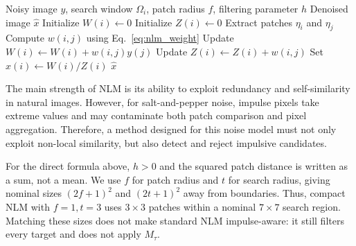 \documentclass[pdflatex,iicol,sn-mathphys-num]{sn-jnl}
\newcommand{\nlm}{NLM\xspace}
\newif\ifshowportuguese
\newcommand{\pt}[1]{\ifshowportuguese\par\begingroup\small\color{blue!55!black}\noindent\textbf{PT: }#1\par\endgroup\fi}
\begin{document}
\begin{algorithm}[!t]
    \caption{Classical Non-Local Means filter}
    \label{alg:nlm}
    \begin{algorithmic}[1]
        \Require Noisy image \(y\), search window \(\Omega_i\), patch radius \(f\), filtering parameter \(h\)
        \Ensure Denoised image \(\hat{x}\)
            \State Initialize \(W(i) \gets 0\)
            \State Initialize \(Z(i) \gets 0\)
                \State Extract patches \(\eta_i\) and \(\eta_j\)
                \State Compute \(w(i,j)\) using Eq.~\eqref{eq:nlm_weight}
                \State Update \(W(i) \gets W(i)+w(i,j)y(j)\)
                \State Update \(Z(i) \gets Z(i)+w(i,j)\)
            \EndFor
            \State Set \(\hat{x}(i) \gets W(i)/Z(i)\)
        \EndFor
        \State \Return \(\hat{x}\)
    \end{algorithmic}
\end{algorithm}

The main strength of \nlm is its ability to exploit redundancy and self-similarity in natural images. However, for salt-and-pepper noise, impulse pixels take extreme values and may contaminate both patch comparison and pixel aggregation. Therefore, a method designed for this noise model must not only exploit non-local similarity, but also detect and reject impulsive candidates.
\pt{A principal força do \nlm é sua capacidade de explorar redundância e auto-similaridade em imagens naturais. Entretanto, para ruído sal-e-pimenta, pixels impulsivos assumem valores extremos e podem contaminar tanto a comparação entre patches quanto a agregação de pixels. Portanto, um método projetado para esse modelo de ruído deve não apenas explorar similaridade não local, mas também detectar e rejeitar candidatos impulsivos.}


For the direct formula above, $h>0$ and the squared patch distance is written as a sum, not a mean. We use $f$ for patch radius and $t$ for search radius, giving nominal sizes $(2f+1)^2$ and $(2t+1)^2$ away from boundaries. Thus, compact NLM with $f=1,t=3$ uses $3\times3$ patches within a nominal $7\times7$ search region. Matching these sizes does not make standard NLM impulse-aware: it still filters every target and does not apply $M_\tau$.
\pt{Na fórmula direta acima, $h>0$ e a distância quadrática entre patches é escrita como soma, não como média. Usamos $f$ para o raio do patch e $t$ para o raio de busca, fornecendo tamanhos nominais $(2f+1)^2$ e $(2t+1)^2$ longe das bordas. Assim, o NLM compacto com $f=1,t=3$ usa patches $3\times3$ em uma região nominal de busca $7\times7$. Igualar esses tamanhos não torna o NLM padrão orientado a impulsos: ele continua filtrando todos os alvos e não aplica $M_\tau$.}
\end{document}
